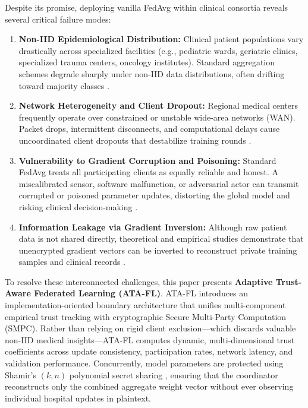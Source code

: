 \documentclass[conference]{IEEEtran}
\begin{document}
Despite its promise, deploying vanilla FedAvg within clinical consortia reveals several critical failure modes:
\begin{enumerate}
    \item \textbf{Non-IID Epidemiological Distribution:} Clinical patient populations vary drastically across specialized facilities (e.g., pediatric wards, geriatric clinics, specialized trauma centers, oncology institutes). Standard aggregation schemes degrade sharply under non-IID data distributions, often drifting toward majority classes \cite{zhao2021federated, li2020federated}.
    \item \textbf{Network Heterogeneity and Client Dropout:} Regional medical centers frequently operate over constrained or unstable wide-area networks (WAN). Packet drops, intermittent disconnects, and computational delays cause uncoordinated client dropouts that destabilize training rounds \cite{khan2020federated}.
    \item \textbf{Vulnerability to Gradient Corruption and Poisoning:} Standard FedAvg treats all participating clients as equally reliable and honest. A miscalibrated sensor, software malfunction, or adversarial actor can transmit corrupted or poisoned parameter updates, distorting the global model and risking clinical decision-making \cite{kang2019incentive, blanchard2017machine}.
    \item \textbf{Information Leakage via Gradient Inversion:} Although raw patient data is not shared directly, theoretical and empirical studies demonstrate that unencrypted gradient vectors can be inverted to reconstruct private training samples and clinical records \cite{bonawitz2017practical, mohassel2017secureml}.
\end{enumerate}

To resolve these interconnected challenges, this paper presents \textbf{Adaptive Trust-Aware Federated Learning (ATA-FL)}. ATA-FL introduces an implementation-oriented boundary architecture that unifies multi-component empirical trust tracking with cryptographic Secure Multi-Party Computation (SMPC). Rather than relying on rigid client exclusion---which discards valuable non-IID medical insights---ATA-FL computes dynamic, multi-dimensional trust coefficients across update consistency, participation rates, network latency, and validation performance. Concurrently, model parameters are protected using Shamir's $(k, n)$ polynomial secret sharing \cite{shamir1979share}, ensuring that the coordinator reconstructs only the combined aggregate weight vector without ever observing individual hospital updates in plaintext.
\end{document}
